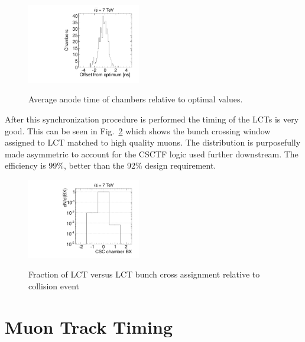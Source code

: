 \begin{figure}
  \begin{center}
      \includegraphics[clip=true, trim=0.0cm 0cm 3.0cm 0cm, width=0.44\textwidth]{figures/timing/average_anodes}
      \renewcommand\baselinestretch{1}\caption[Gluino1200f100 System Pt vs MET]
      {Average anode time of chambers relative to optimal values.
        }
      \renewcommand\baselinestretch{\@spacing}
      \label{fig:average_anodes}
  \end{center}
\end{figure}

After this synchronization procedure is performed the timing of the LCTs is very good. This can be seen in Fig.~\ref{fig:ALCTBX} which shows the bunch crossing window
assigned to LCT matched to high quality muons. The distribution is purposefully made asymmetric to account for the CSCTF logic used further downstream.
The efficiency is 99\%, better than the 92\% design requirement.

\begin{figure}
  \begin{center}
      \includegraphics[clip=true, width=0.44\textwidth]{figures/timing/ALCT_Bx}
      \renewcommand\baselinestretch{1}\caption[Gluino1200f100 System Pt vs MET]
      {Fraction of LCT versus LCT bunch cross assignment relative to collision event
        }
      \renewcommand\baselinestretch{\@spacing}
      \label{fig:ALCTBX}
  \end{center}
\end{figure}

\section{Muon Track Timing}

